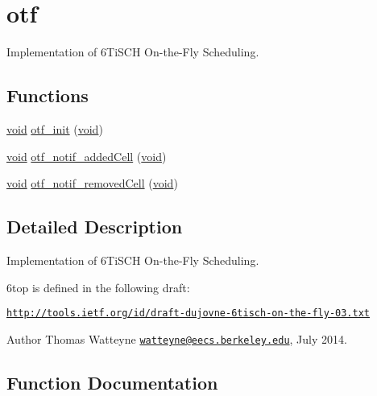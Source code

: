 \hypertarget{group__otf}{}\section{otf}
\label{group__otf}


Implementation of 6\+Ti\+S\+CH On-\/the-\/\+Fly Scheduling.  


\subsection*{Functions}
\begin{DoxyCompactItemize}
\item 
\hyperlink{usb__devapi_8h_afabf60e7f57651d6d595a02c75f07cd0}{void} \hyperlink{group__otf_ga04b7c81141e2ab79d1b8744eb330a965}{otf\+\_\+init} (\hyperlink{usb__devapi_8h_afabf60e7f57651d6d595a02c75f07cd0}{void})
\item 
\hyperlink{usb__devapi_8h_afabf60e7f57651d6d595a02c75f07cd0}{void} \hyperlink{group__otf_ga4e965d3109977c730242358ca6429c6e}{otf\+\_\+notif\+\_\+added\+Cell} (\hyperlink{usb__devapi_8h_afabf60e7f57651d6d595a02c75f07cd0}{void})
\item 
\hyperlink{usb__devapi_8h_afabf60e7f57651d6d595a02c75f07cd0}{void} \hyperlink{group__otf_ga82922e93857a8b5b6f7fb5a84053abf3}{otf\+\_\+notif\+\_\+removed\+Cell} (\hyperlink{usb__devapi_8h_afabf60e7f57651d6d595a02c75f07cd0}{void})
\end{DoxyCompactItemize}


\subsection{Detailed Description}
Implementation of 6\+Ti\+S\+CH On-\/the-\/\+Fly Scheduling. 

6top is defined in the following draft\+:
\begin{DoxyItemize}
\item \href{http://tools.ietf.org/id/draft-dujovne-6tisch-on-the-fly-03.txt}{\tt http\+://tools.\+ietf.\+org/id/draft-\/dujovne-\/6tisch-\/on-\/the-\/fly-\/03.\+txt}
\end{DoxyItemize}

\begin{DoxyAuthor}{Author}
Thomas Watteyne \href{mailto:watteyne@eecs.berkeley.edu}{\tt watteyne@eecs.\+berkeley.\+edu}, July 2014. 
\end{DoxyAuthor}


\subsection{Function Documentation}
